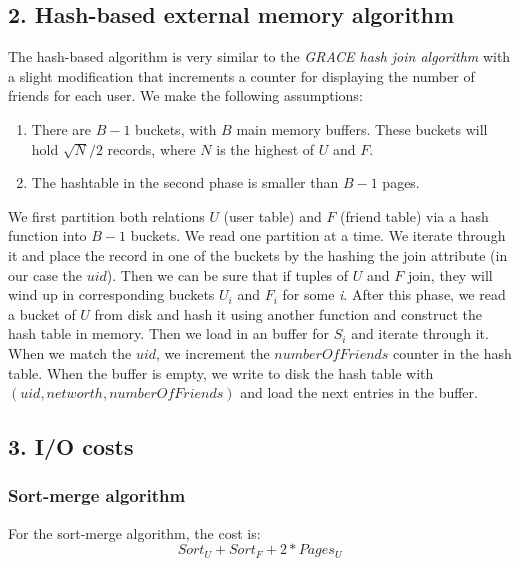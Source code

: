 \documentclass{article}      %
\begin{document}
\subsection* {2. Hash-based external memory algorithm}

The hash-based algorithm is very similar to the \emph{GRACE hash join algorithm} with a slight modification that increments a counter for displaying the number of friends for each user. We make the following assumptions:

\begin{enumerate}
\item 
There are $B-1$ buckets, with $B$ main memory buffers. These buckets will hold \begin{math}\sqrt{N}/2\end{math} records, where $N$ is the highest of $U$ and $F$. 
\item
The hashtable in the second phase is smaller than $B-1$ pages.
\end{enumerate}

We first partition both relations $U$ (user table) and $F$ (friend table) via a hash function into $B-1$ buckets. We read one partition at a time. We iterate through it and place the record in one of the buckets by the hashing the join attribute (in our case the $uid$). Then we can be sure that if tuples of $U$ and $F$ join, they will wind up in corresponding buckets $U_i$ and $F_i$ for some \emph{i}. After this phase, we read a bucket of $U$ from disk and hash it using another function and construct the hash table in memory. Then we load in an buffer for $S_i$ and iterate through it. When we match the $uid$, we increment the $numberOfFriends$ counter in the hash table. When the buffer is empty, we write to disk the hash table with $(uid, networth, numberOfFriends)$ and load the next entries in the buffer.\\

\subsection* {3. I/O costs}

\subsubsection* {Sort-merge algorithm}

For the sort-merge algorithm, the cost is:
\begin{equation}
Sort_U + Sort_F + 2 * Pages_U 
\end{equation}
\end{document}
